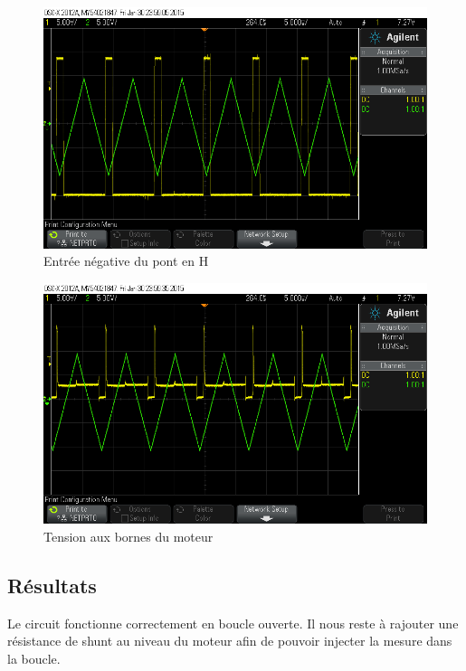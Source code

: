 \documentclass[a4paper]{article}
\begin{document}
\begin{figure}[H]
  \centering
    \includegraphics[width=1\textwidth]{scope_2}
  \caption{Entrée négative du pont en H}
\end{figure}

\begin{figure}[H]
  \centering
    \includegraphics[width=1\textwidth]{scope_3}
  \caption{Tension aux bornes du moteur}
\end{figure}

\subsection{Résultats}

Le circuit fonctionne correctement en boucle ouverte. Il nous reste à rajouter une résistance de shunt au niveau du moteur afin de pouvoir injecter la mesure dans la boucle.
\end{document}
